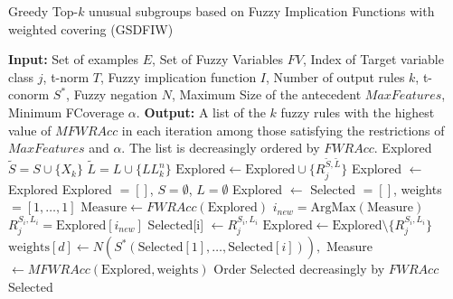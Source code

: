 \begin{algorithm}[H]
	\small
	\caption{Greedy Top-$k$ unusual subgroups based on Fuzzy Implication Functions with weighted covering (GSDFIW)}\label{alg:GSDFIW}
	\begin{algorithmic}
		\State \textbf{Input:} Set of examples $E$, Set of Fuzzy Variables $FV$, Index of Target variable class $j$, t-norm $T$, Fuzzy implication function $I$, Number of output rules $k$, t-conorm $S^*$, Fuzzy negation $N$, Maximum Size of the antecedent $MaxFeatures$, Minimum FCoverage $\alpha$.
		\State \textbf{Output:} A list of the $k$ fuzzy rules with the highest value of $MFWRAcc$ in each iteration among those satisfying the restrictions of $MaxFeatures$ and $\alpha$. The list is decreasingly ordered by $FWRAcc$.
		\State
		\State \Return Explored
		\Else
		\State $\tilde{S}= S \cup \{X_{k}\}$
		\State $\tilde{L} = L \cup \{LL^n_{k}\}$
		\State $\text{Explored} \leftarrow \text{Explored} \cup \{R_{j}^{\tilde{S},\tilde{L}}\}$
		\State Explored $\leftarrow$ 
		\EndIf
		\EndFor
		\EndFor
		\State \Return Explored
		\EndIf
		\EndFunction
		\State
		\State Explored $= []$, $S = \emptyset$, $L = \emptyset$
		\State Explored $\leftarrow$ 
		\State Selected $=[]$, weights $= [1,\dots,1]$
		\State $\text{Measure} \leftarrow FWRAcc(\text{Explored})$ 
		\State $i_{new} = \text{ArgMax} (\text{Measure})$
		\State $R_j^{S_i,L_i} = \text{Explored}[i_{new}]$
		\State Selected[i] $ \leftarrow R_j^{S_i,L_i}$
		\State $\text{Explored} \leftarrow \text{Explored} \setminus \{R_j^{S_i,L_i}\}$
		\State $\text{weights}[d] \leftarrow N(S^*(\text{Selected}[1], \dots, \text{Selected}[i])),$
		\EndFor
		\State Measure $\leftarrow MFWRAcc(\text{Explored},\text{weights})$
		\EndFor
		\State Order Selected decreasingly by $FWRAcc$
		\State \Return Selected
		\EndFunction
	\end{algorithmic}
\end{algorithm}

